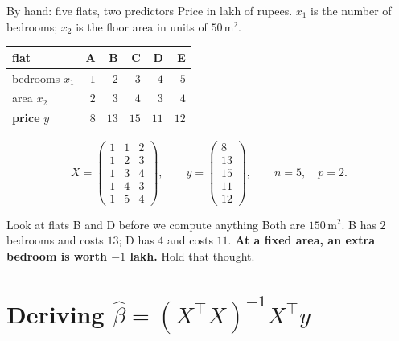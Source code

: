 \documentclass[aspectratio=169]{beamer}
\newcommand{\Xt}{X^{\!\top}}
\begin{document}
\begin{frame}[shrink=8]{By hand: five flats, two predictors}
  Price in lakh of rupees. $x_1$ is the number of bedrooms; $x_2$ is the floor
  area in units of $50\,\mathrm{m}^2$.
  \begin{center}\small
  \begin{tabular}{@{}lrrrrr@{}}
    \toprule
    flat & A & B & C & D & E\\
    \midrule
    bedrooms $x_1$ & $1$ & $2$ & $3$ & $4$ & $5$\\
    area $x_2$ & $2$ & $3$ & $4$ & $3$ & $4$\\
    \midrule
    \textbf{price} $y$ & $8$ & $13$ & $15$ & $11$ & $12$\\
    \bottomrule
  \end{tabular}
  \end{center}
  \vspace{0.2em}
  \[
    X = \begin{pmatrix}
      1 & 1 & 2\\ 1 & 2 & 3\\ 1 & 3 & 4\\ 1 & 4 & 3\\ 1 & 5 & 4
    \end{pmatrix},
    \qquad
    y = \begin{pmatrix} 8\\13\\15\\11\\12 \end{pmatrix},
    \qquad
    n = 5,\quad p = 2 .
  \]
  \begin{block}{Look at flats B and D before we compute anything}
    \small Both are $150\,\mathrm{m}^2$. B has $2$ bedrooms and costs $13$;
    D has $4$ and costs $11$. \textbf{At a fixed area, an extra bedroom is
    worth $-1$ lakh.} Hold that thought.
  \end{block}
\end{frame}

\section[Derivation]{Deriving \texorpdfstring{$\hat\beta = (\Xt X)^{-1}\Xt y$}{beta-hat = (X\textquotesingle X)\textasciicircum-1 X\textquotesingle y}}
\label{sec:derive}
\end{document}
